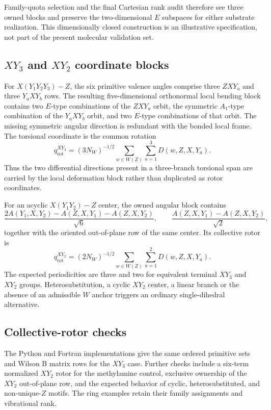 \documentclass[10pt]{article}
\begin{document}
Family-quota selection and the final Cartesian rank audit therefore see three
owned blocks and preserve the two-dimensional \(E\) subspaces for either
substrate realization.  This dimensionally closed construction is an
illustrative specification, not part of the present molecular validation
{set}.

\subsection{\texorpdfstring{\(XY_3\) and \(XY_2\)}{XY3 and XY2} coordinate blocks}

For \(X(Y_1Y_2Y_3)-Z\), the six primitive valence angles comprise three
\(ZXY_a\) and three \(Y_aXY_b\) rows.  The resulting five-dimensional
orthonormal local bending block contains two \(E\)-type combinations of the
\(ZXY_a\) orbit, the symmetric \(A_1\)-type combination of the
\(Y_aXY_b\) orbit, and two \(E\)-type combinations of that orbit.  The
missing symmetric angular direction is redundant with the bonded local frame.
The torsional coordinate is the common rotation
\[
q_{\mathrm{rot}}^{XY_3}=(3N_W)^{-1/2}
\sum_{w\in W(Z)}\sum_{a=1}^{3}D(w,Z,X,Y_a).
\]
Thus the two differential directions present in a three-branch torsional span
are carried by the local deformation block rather than duplicated as rotor
coordinates.

For an acyclic \(X(Y_1Y_2)-Z\) center, the owned angular block contains
\[
\frac{2A(Y_1,X,Y_2)-A(Z,X,Y_1)-A(Z,X,Y_2)}{\sqrt{6}},
\qquad
\frac{A(Z,X,Y_1)-A(Z,X,Y_2)}{\sqrt{2}},
\]
together with the oriented out-of-plane row of the same center.  Its collective
rotor is
\[
q_{\mathrm{rot}}^{XY_2}=(2N_W)^{-1/2}
\sum_{w\in W(Z)}\sum_{a=1}^{2}D(w,Z,X,Y_a).
\]
The expected periodicities are three and two for equivalent terminal
\(XY_3\) and \(XY_2\) groups.  Heterosubstitution, a cyclic \(XY_2\)
center, a linear branch or the absence of an admissible \(W\) anchor triggers
an ordinary single-dihedral alternative.

\subsection{Collective-rotor checks}

The Python and Fortran implementations give the same ordered primitive sets
and Wilson B matrix rows for the \(XY_3\) case. Further checks include a six-term normalized \(XY_2\) rotor for the
methylamine control, exclusive ownership of the \(XY_2\) out-of-plane row,
and the expected behavior of cyclic, heterosubstituted, and non-unique-\(Z\) motifs.
The ring examples retain their family assignments and vibrational rank.
\end{document}
